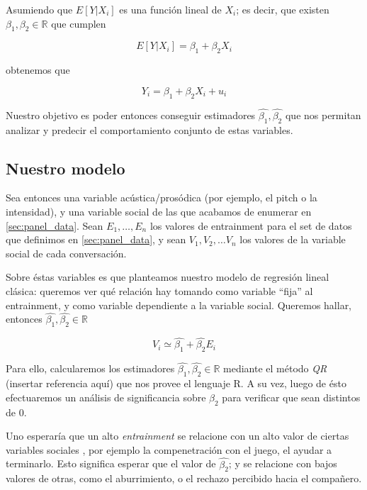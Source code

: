 Asumiendo que $E[Y|X_i]$ es una función lineal de $X_i$; es decir, que existen $\beta_1, \beta_2 \in \mathbb{R}$ que cumplen

\begin{equation}
  E[Y|X_i] = \beta_1 + \beta_2 X_i
\end{equation}

obtenemos que

\begin{equation}
  Y_i = \beta_1 + \beta_2 X_i + u_i
\end{equation}

Nuestro objetivo es poder entonces conseguir estimadores $\widehat{\beta_1}, \widehat{\beta_2}$ que nos permitan analizar y predecir el comportamiento conjunto de estas variables.

\subsection{Nuestro modelo}

Sea entonces una variable acústica/prosódica (por ejemplo, el pitch o la intensidad), y una variable social de las que acabamos de enumerar en \ref{sec:panel_data}. Sean $E_1, \ldots, E_n$ los valores de entrainment para el set de datos que definimos en \ref{sec:panel_data}, y sean $V_1, V_2, \ldots V_n$ los valores de la variable social de cada conversación.

Sobre éstas variables es que planteamos nuestro modelo de regresión lineal clásica: queremos ver qué relación hay tomando como variable ``fija'' al entrainment, y como variable dependiente a la variable social. Queremos hallar, entonces $\widehat{\beta_1}, \widehat{\beta_2} \in \mathbb{R}$

\begin{equation}
  V_i \simeq \widehat{\beta_1} + \widehat{\beta_2} E_i
\end{equation}


Para ello, calcularemos los estimadores $\widehat{\beta_1}, \widehat{\beta_2} \in \mathbb{R}$ mediante el método \emph{QR} (insertar referencia aquí) que nos provee el lenguaje R. A su vez, luego de ésto efectuaremos un análisis de significancia sobre $\beta_2$ para verificar que sean distintos de 0.


Uno esperaría que un alto \emph{entrainment} se relacione con un alto valor de ciertas variables sociales \cite{BRE1996}, por ejemplo la compenetración con el juego, el ayudar a terminarlo. Esto significa esperar que el valor de $\widehat{\beta_2}$; y se relacione con bajos valores de otras, como el aburrimiento, o el rechazo percibido hacia el compañero.


